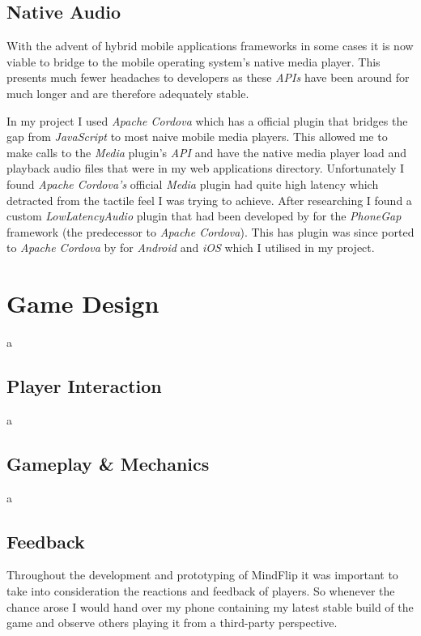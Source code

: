 \documentclass[final]{cmpreport}
\begin{document}
\subsection{Native Audio}
With the advent of hybrid mobile applications frameworks in some cases it is now viable to bridge to the mobile operating system's native media player. This presents much fewer headaches to developers as these \textit{APIs} have been around for much longer and are therefore adequately stable.

In my project I used \textit{Apache Cordova} which has a official plugin that bridges the gap from \textit{JavaScript} to most naive mobile media players. This allowed me to make calls to the \textit{Media} plugin's \textit{API} and have the native media player load and playback audio files that were in my web applications directory. Unfortunately I found \textit{Apache Cordova's} official \textit{Media} plugin had quite high latency which detracted from the tactile feel I was trying to achieve. After researching I found a custom \textit{LowLatencyAudio} plugin that had been developed by \citep{Trice} for the \textit{PhoneGap} framework (the predecessor to \textit{Apache Cordova}). This has plugin was since ported to \textit{Apache Cordova} by \citep{Xie} for \textit{Android} and \textit{iOS} which I utilised in my project.

\section{Game Design}
a

\subsection{Player Interaction}
a

\subsection{Gameplay \& Mechanics}
a

\subsection{Feedback}
Throughout the development and prototyping of MindFlip it was important to take into consideration the reactions and feedback of players. So whenever the chance arose I would hand over my phone containing my latest stable build of the game and observe others playing it from a third-party perspective.
\end{document}
